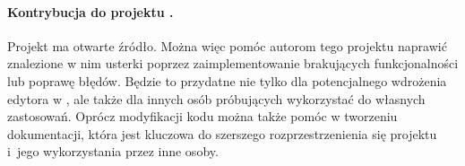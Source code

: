 \paragraph{Kontrybucja do projektu \SiriusWeb{}.}
Projekt \SiriusWeb{} ma otwarte źródło. Można więc pomóc autorom tego
projektu naprawić znalezione w nim usterki poprzez zaimplementowanie
brakujących funkcjonalności lub poprawę błędów. Będzie to przydatne nie tylko
dla potencjalnego wdrożenia edytora w \BalticLSC{}, ale także dla innych
osób próbujących wykorzystać \SiriusWeb{} do własnych zastosowań.
Oprócz modyfikacji kodu można także pomóc w tworzeniu dokumentacji, która jest
kluczowa do szerszego rozprzestrzenienia się projektu i~jego wykorzystania
przez inne osoby.
